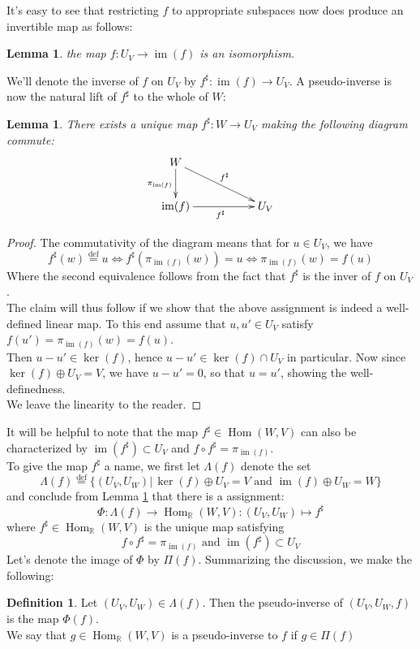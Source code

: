 \documentclass{book}
\theoremstyle{plain}
\newtheorem{lemma}[corollary]{Lemma}
\theoremstyle{definition}
\newtheorem{definition}[corollary]{Definition}
\renewcommand{\d}[1]{\mathbb{#1}}
\newcommand{\define}{\stackrel{\operatorname{def}}{=}}
\newcommand{\ds}{\oplus}
\newcommand{\fun}{\mapsto}
\DeclareMathOperator{\Hom}{Hom}
\DeclareMathOperator{\im}{im}
\newcommand{\mor}{\longrightarrow}
\begin{document}
It's easy to see that restricting $f$ to appropriate subspaces now does produce an invertible map as follows:

\begin{lemma}
	the map $f: U_V\mor \im(f)$ is an isomorphism.
\end{lemma}
\noindent We'll denote the inverse of $f$ on $U_V$ by $f^\sharp:\im(f)\mor U_V$. A pseudo-inverse is now the natural lift of $f^\sharp$ to the whole of $W$:


\begin{lemma}\label{lem:pseudo-inverse}
	There exists a unique map $f^\sharp:W\mor U_V$ making the following diagram commute:
	\begin{displaymath}
	\xymatrix{
	W\ar[d]_{\pi_{\im(f)}}\ar[drr]^{f^\sharp}\\
	\im(f)\ar[rr]_{f^\sharp} && U_V
	}
	\end{displaymath}
\end{lemma}

\begin{proof}
The commutativity of the diagram means that for $u \in U_V$, we have
\[
	f^\sharp(w) \define u\iff f^\sharp(\pi_{\im(f)}(w)) =u\iff \pi_{\im(f)}(w) =f(u)
\]
Where the second equivalence follows from the fact that $f^\sharp$ is the inver of $f$ on $U_V$.\\
The claim will thus follow if we show that the above assignment is indeed a well-defined linear map. To this end assume that $u,u' \in U_V$ satisfy $f(u')=\pi_{\im(f)}(w)=f(u)$.\\ Then $u-u' \in \ker(f)$, hence $u-u' \in \ker(f)\cap U_V$ in particular. Now since $\ker(f)\ds U_V =V$, we have  $u-u'=0$, so that $u=u'$, showing the well-definedness.\\ 
We leave the linearity to the reader.
\end{proof}
It will be helpful to note that the map $f^\sharp\in \Hom(W,V)$ can also be characterized by $\im(f^\sharp)\subset U_V$ and $f\circ f^\sharp =\pi_{\im(f)}$.\\
To give the map $f^\sharp$ a name, we first let $\Lambda(f)$ denote the set
\[
\Lambda(f)\define \{(U_V,U_W)\vert \, \ker(f)\ds U_V=V \textrm{ and } \im(f)\ds U_W =W \}
\]
and conclude from Lemma \ref{lem:pseudo-inverse} that there is a assignment:
\[
\Phi: \Lambda(f)\mor \Hom_\d{R}(W,V):(U_V,U_W)\fun f^\sharp
\]
where $f^\sharp \in \Hom_{\d{R}}(W,V)$ is the unique map satisfying
\[
f \circ f^\sharp = \pi_{\im(f)} \textrm{ and } \im(f^\sharp)\subset U_V
\]
Let's denote the image of $\Phi$ by $\Pi(f)$. Summarizing the discussion, we make the following:
\begin{definition}\label{def:ps}
Let $(U_V,U_W) \in \Lambda(f)$. Then the pseudo-inverse of $(U_V,U_W,f)$ is the map $\Phi(f)$.\\
We say that $g\in \Hom_{\d{R}}(W,V)$ is a pseudo-inverse to $f$ if $g\in \Pi(f)$
\end{definition}
\end{document}
